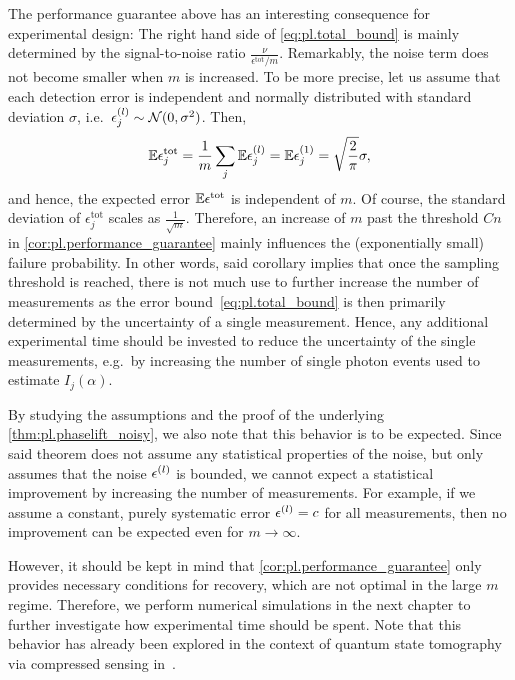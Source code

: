 The performance guarantee above has an interesting consequence for experimental design:
The right hand side of \cref{eq:pl.total_bound} is mainly determined by the signal-to-noise ratio $\frac{\nu}{\epsilon^\mathrm{tot} / m}$.
Remarkably, the noise term does not become smaller when $m$ is increased.
To be more precise, let us assume that each detection error  is independent and normally distributed with standard deviation $\sigma$, i.e.\ $\epsilon^{(l)}_j \sim \mathcal{N}(0, \sigma^2)$.
Then,
\[
  \mathbb{E} \epsilon^\mathrm{tot}_j = \frac{1}{m} \sum_j \mathbb{E} \epsilon^{(l)}_j = \mathbb{E} \epsilon^{(1)}_j = \sqrt{\frac{2}{\pi}} \sigma,
\]
and hence, the expected error $\mathbb{E} \epsilon^\mathrm{tot}$ is independent of $m$.
Of course, the standard deviation of $\epsilon^\mathrm{tot}_j$ scales as $\frac{1}{\sqrt{m}}$.
Therefore, an increase of $m$ past the threshold $Cn$ in \cref{cor:pl.performance_guarantee} mainly influences the (exponentially small) failure probability.
In other words, said corollary implies that once the sampling threshold is reached, there is not much use to further increase the number of measurements as the error bound~\eqref{eq:pl.total_bound} is then primarily determined by the uncertainty of a single measurement.
Hence, any additional experimental time should be invested to reduce the uncertainty of the single measurements, e.g.\ by increasing the number of single photon events used to estimate $I_j(\alpha)$.

By studying the assumptions and the proof of the underlying \cref{thm:pl.phaselift_noisy}, we also note that this behavior is to be expected.
Since said theorem does not assume any statistical properties of the noise, but only assumes that the noise $\epsilon^{(l)}$ is bounded, we cannot expect a statistical improvement by increasing the number of measurements.
For example, if we assume a constant, purely systematic error $\epsilon^{(l)} = c$ for all measurements, then no improvement can be expected even for $m\to\infty$.

However, it should be kept in mind that \cref{cor:pl.performance_guarantee} only provides necessary conditions for recovery, which are not optimal in the large $m$ regime.
Therefore, we perform numerical simulations in the next chapter to further investigate how experimental time should be spent.
Note that this behavior has already been explored in the context of quantum state tomography via compressed sensing in~\cite{Flammia_2012_Quantum}.


